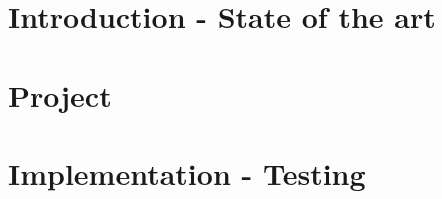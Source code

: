 



\frenchspacing
\raggedbottom
{}
\pagestyle{plain}

\cleardoublepage
\cleardoublepage
\cleardoublepage\tableofcontents
\clearpage
\cleardoublepage
\newpage
{}
\pagestyle{scrheadings}
\sloppy
\part{Introduction - State of the art}


\part{Project}
\part{Implementation - Testing}

\clearpage
\nocite{*}
{}




